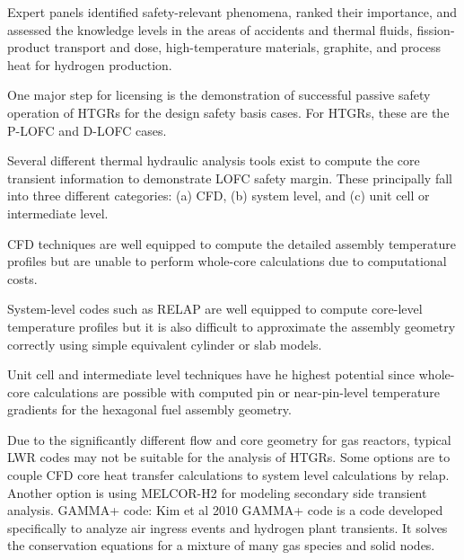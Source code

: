 


Expert panels identified safety-relevant phenomena, ranked their importance, and assessed
the knowledge levels in the areas of accidents and thermal fluids, fission-product transport and dose,
high-temperature materials, graphite, and process heat for hydrogen production.





One major step for licensing is the demonstration of successful passive safety operation of HTGRs for the design safety basis cases.
For HTGRs, these are the P-LOFC and D-LOFC cases.

Several different thermal hydraulic analysis tools exist to compute the core transient information to demonstrate LOFC safety margin.
These principally fall into three different categories: (a) CFD, (b) system level, and (c) unit cell or intermediate level.

CFD techniques are well equipped to compute the detailed assembly temperature profiles but are unable to perform whole-core calculations due to computational costs.

System-level codes such as RELAP are well equipped to compute core-level temperature profiles but it is also difficult to approximate the assembly geometry correctly using simple equivalent cylinder or slab models. 

Unit cell and intermediate level techniques have he highest potential since whole-core calculations are possible with computed pin or near-pin-level temperature gradients for the hexagonal fuel assembly geometry.


Due to the significantly different flow and core geometry for gas reactors, typical LWR codes may not be suitable for the analysis of HTGRs.
Some options are to couple CFD core heat transfer calculations to system level calculations by relap.
Another option is using MELCOR-H2 for modeling secondary side transient analysis.
GAMMA+ code:
Kim et al 2010 %
GAMMA+ code is a code developed specifically to analyze air ingress events and hydrogen plant transients.
It solves the conservation equations for a mixture of many gas species and solid nodes.

